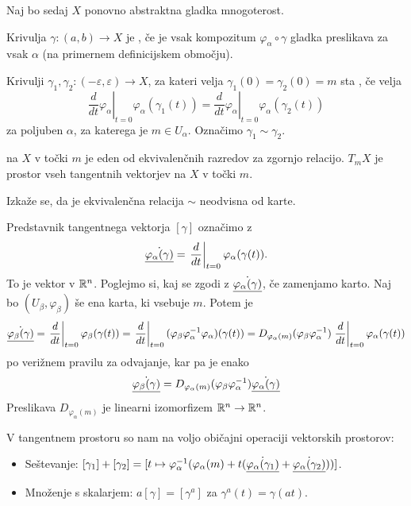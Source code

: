 Naj bo sedaj $X$ ponovno abstraktna gladka mnogoterost.

\begin{definicija}
  Krivulja $\gamma: (a,b) \to X$ je , če je vsak kompozitum
  $\varphi_\alpha \circ \gamma$ gladka preslikava za vsak $\alpha$ (na primernem
  definicijskem območju).
\end{definicija}

\begin{definicija}
  Krivulji $\gamma_1, \gamma_2: (-\varepsilon, \varepsilon) \to X$, za kateri
  velja $\gamma_1(0) = \gamma_2(0) = m$ sta , če velja
  \[
	\left. \frac{d}{dt} \varphi_\alpha \right|_{t=0} \varphi_\alpha(\gamma_1(t))
	= \left. \frac{d}{dt} \varphi_\alpha \right|_{t=0} \varphi_\alpha(\gamma_2(t))
  \]
  za poljuben $\alpha$, za katerega je $m \in U_\alpha$.
  Označimo $\gamma_1 \sim \gamma_2$.
\end{definicija}

\begin{definicija}
   na $X$ v točki $m$ je eden od ekvivalenčnih razredov
  za zgornjo relacijo.
   $T_m X$ je prostor vseh tangentnih vektorjev na $X$
  v točki $m$.
\end{definicija}

\begin{opomba}
  Izkaže se, da je ekvivalenčna relacija $\sim$ neodvisna od karte.
\end{opomba}

Predstavnik tangentnega vektorja $[\gamma]$ označimo z
\[
  \dot{\underline{\varphi_\alpha(\gamma)}} = \left. \frac{d}{dt} \right|_{t=0}
  \varphi_\alpha(\gamma(t)).
\]
To je vektor v $\mathbb{R}^n$.
Poglejmo si, kaj se zgodi z $\dot{\underline{\varphi_\alpha(\gamma)}}$, če zamenjamo karto.
Naj bo $(U_\beta, \varphi_\beta)$ še ena karta, ki vsebuje $m$.
Potem je
\[
  \dot{\underline{\varphi_\beta(\gamma)}}
  = \left. \frac{d}{dt} \right|_{t=0} \varphi_\beta(\gamma(t))
  = \left. \frac{d}{dt} \right|_{t=0} (\varphi_\beta \varphi_\alpha^{-1}
  \varphi_\alpha)(\gamma(t))
  = D_{\varphi_\alpha(m)} (\varphi_\beta \varphi_\alpha^{-1}) \left.
	\frac{d}{dt} \right|_{t=0} \varphi_\alpha(\gamma(t))
\]
po verižnem pravilu za odvajanje, kar pa je enako
\[
  \dot{\underline{\varphi_\beta(\gamma)}}
  = D_{\varphi_\alpha(m)} (\varphi_\beta \varphi_\alpha^{-1})
  \dot{\underline{\varphi_\alpha(\gamma)}}
\]
Preslikava $D_{\varphi_\alpha(m)}$ je linearni izomorfizem $\mathbb{R}^n \to \mathbb{R}^n$.

V tangentnem prostoru so nam na voljo običajni operaciji vektorskih prostorov:
\begin{itemize}
\item Seštevanje: $[\gamma_1] + [\gamma_2] = [ t \mapsto
  \varphi_\alpha^{-1}(\varphi_\alpha(m) + t
  (\dot{\underline{\varphi_\alpha(\gamma_1)}} + \dot{\underline{\varphi_\alpha(\gamma_2)}}
  )) ]$.
\item Množenje s skalarjem: $a [\gamma] = [\gamma^a]$ za $\gamma^a(t) =
  \gamma(at)$.
\end{itemize}

